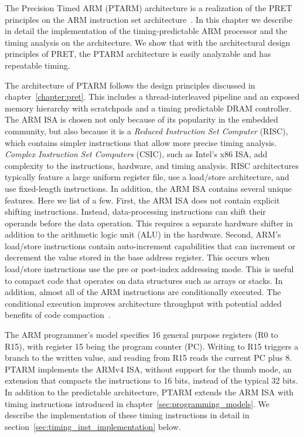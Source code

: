 The Precision Timed ARM (PTARM) architecture is a realization of the PRET principles on the ARM instruction set architecture~\cite{armrefman}. 
In this chapter we describe in detail the implementation of the timing-predictable ARM processor and the timing analysis on the architecture.
We show that with the architectural design principles of PRET, the PTARM architecture is easily analyzable and has repeatable timing.
  
The architecture of PTARM follows the design principles discussed in chapter~\ref{chapter:pret}.
This includes a thread-interleaved pipeline and an exposed memory hierarchy with scratchpads and a timing predictable DRAM controller.
The ARM ISA is chosen not only because of its popularity in the embedded community, but also because it is a \emph{Reduced Instruction Set Computer} (RISC), which contains simpler instructions that allow more precise timing analysis. 
\emph{Complex Instruction Set Computers} (CSIC), such as Intel's x86 ISA, add complexity to the instructions, hardware, and timing analysis.
RISC architectures typically feature a large uniform register file, use a load/store architecture, and use fixed-length instructions.
In addition, the ARM ISA contains several unique features. 
Here we list of a few.  
First, the ARM ISA does not contain explicit shifting instructions.
Instead, data-processing instructions can shift their operands before the data operation. 
This requires a separate hardware shifter in addition to the arithmetic logic unit (ALU) in the hardware.  
Second, ARM's load/store instructions contain auto-increment capabilities that can increment or decrement the value stored in the base address register.
This occurs when load/store instructions use the pre or post-index addressing mode.   
This is useful to compact code that operates on data structures such as arrays or stacks. 
In addition, almost all of the ARM instructions are conditionally executed.
The conditional execution improves architecture throughput with potential added benefits of code compaction~\cite{cheung_code_compact_pred03}.     

The ARM programmer's model specifies 16 general purpose registers (R0 to R15), with register 15 being the program counter (PC). 
Writing to R15 triggers a branch to the written value, and reading from R15 reads the current PC plus 8.
PTARM implements the ARMv4 ISA, without support for the thumb mode, an extension that compacts the instructions to 16 bits, instead of the typical 32 bits. 
In addition to the predictable architecture, PTARM extends the ARM ISA with timing instructions introduced in chapter~\ref{sec:programming_models}.
We describe the implementation of these timing instructions in detail in section~\ref{sec:timing_inst_implementation} below.    

